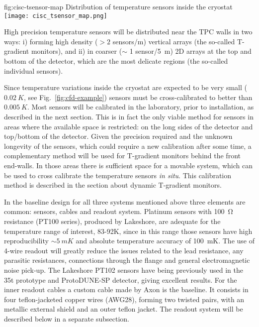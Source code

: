 \begin{dunefigure}{fig:cisc-tsensor-map}
  {Distribution of temperature sensors inside the cryostat}
  \texttt{[image: cisc\_tsensor\_map.png]}
\end{dunefigure}

High precision temperature sensors will be distributed near the TPC walls in two ways:
i) forming high density (\(>2\) sensors/\si{m}) vertical arrays (the so-called T-gradient monitors), and ii) in coarser ($\sim$ 1 sensor/\SI{5}{m}) 2D arrays 
at the top and bottom of the detector, which are the most delicate regions (the so-called individual sensors). 

Since temperature variations inside the cryostat are expected to be very small ($\SI{0.02}{K}$, see Fig.~\ref{fig:cfd-example}) %
sensors must be cross-calibrated to better than $\SI{0.005}{K}$. Most sensors will be calibrated in the laboratory, prior to installation,
as described in the next section. This is in fact the only viable method for sensors in areas where the available space is restricted: on the long sides of the detector
and top/bottom of the detector.
Given the precision required and the unknown longevity of the sensors, which could require a new calibration after some time, a complementary method
will be used for T-gradient monitors behind the front end-walls.
In those areas there is sufficient space for a movable system, which can be used to cross calibrate
the temperature sensors  {\em in situ}. This calibration method is described in the section about dynamic T-gradient monitors. 

In the baseline design for all three systems mentioned above three elements are common: sensors, cables and readout system.
Platinum sensors with \SI{100}{\ohm} resistance (PT100 series), produced by Lakeshore,  
are adequate for the temperature range of interest, 83-92\si{K}, since in this range those sensors have high reproducibility 
$\sim\SI{5}{mK}$ and absolute temperature accuracy of \SI{100}{mK}.
The use of 4-wire readout will greatly reduce the issues related to the lead resistance, any parasitic resistances,
connections through the flange and general electromagnetic noise pick-up. The Lakeshore PT102 sensors
have being previously used in the 35t prototype and ProtoDUNE-SP detector,
giving excellent results. For the inner readout cables a custom cable made by Axon is the baseline. It consists in four teflon-jacketed 
copper wires (AWG28), forming two twisted pairs, with an metallic external shield
and an outer teflon jacket.
The readout system will be described below in a separate subsection. 

